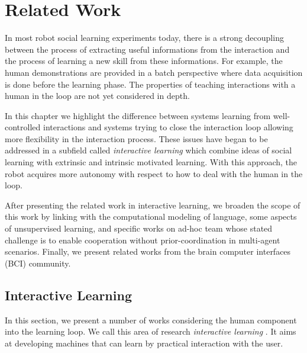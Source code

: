 
\chapter{Related Work}
\label{chapter:relatedwork}
\minitoc

In most robot social learning experiments today, there is a strong decoupling between the process of extracting useful informations from the interaction and the process of learning a new skill from these informations. For example, the human demonstrations are provided in a batch perspective where data acquisition is done before the learning phase. The properties of teaching interactions with a human in the loop are not yet considered in depth.

In this chapter we highlight the difference between systems learning from well-controlled interactions and systems trying to close the interaction loop allowing more flexibility in the interaction process. These issues have began to be addressed in a subfield called \emph{interactive learning}  which combine ideas of social learning with extrinsic and intrinsic motivated learning. With this approach, the robot acquires more autonomy with respect to how to deal with the human in the loop. 

After presenting the related work in interactive learning, we broaden the scope of this work by linking with the computational modeling of language, some aspects of unsupervised learning, and specific works on ad-hoc team whose stated challenge is to enable cooperation without prior-coordination in multi-agent scenarios. Finally, we present related works from the brain computer interfaces (BCI) community.

\section{Interactive Learning}

In this section, we present a number of works considering the human component into the learning loop. We call this area of research \emph{interactive learning} \cite{nicolescu2003natural,breazeal2004tutelage}. It aims at developing machines that can learn by practical interaction with the user.

